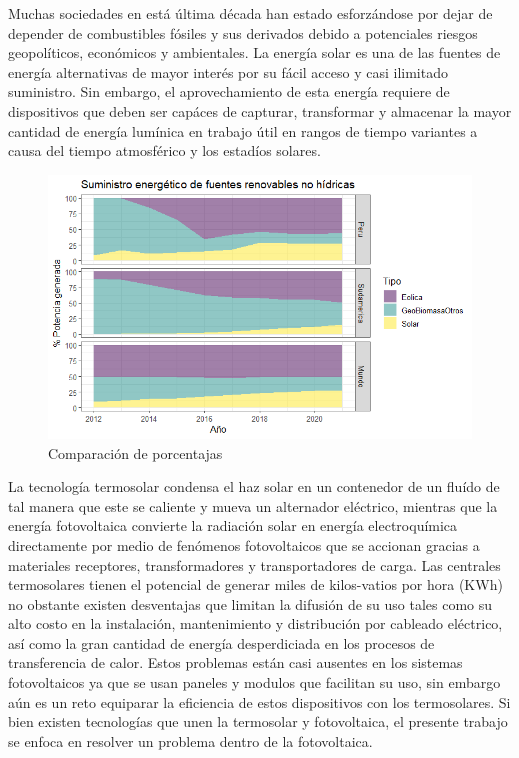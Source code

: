 Muchas sociedades en está última década han estado esforzándose por dejar de depender de combustibles
fósiles y sus derivados debido a potenciales riesgos geopolíticos, económicos y ambientales. La energía solar
es una de las fuentes de energía alternativas de mayor interés por su fácil acceso y casi ilimitado suministro.
Sin embargo, el aprovechamiento de esta energía requiere de dispositivos que deben ser capáces de capturar, transformar 
y almacenar la mayor cantidad de energía lumínica en trabajo útil en rangos de tiempo variantes a causa del tiempo atmosférico y
los estadíos solares.

\begin{figure}[h]
    \includegraphics[scale=0.8]{img/PorcentajeRenovables.png}
    \caption{Comparación de porcentajas}
    \label{img:PorcentajeRenovable}
\end{figure}

La tecnología termosolar condensa el haz solar en un contenedor de un fluído de tal manera que este se caliente
y mueva un alternador eléctrico, mientras que la energía fotovoltaica convierte la radiación solar en energía electroquímica directamente 
por medio de fenómenos fotovoltaicos que se accionan gracias a materiales receptores, transformadores y transportadores de carga.
Las centrales termosolares tienen el potencial de generar miles de kilos-vatios por hora (KWh) no obstante 
existen desventajas que limitan la difusión de su uso tales como su alto costo en la instalación, mantenimiento y distribución por cableado 
eléctrico, así como la gran cantidad de energía desperdiciada en los procesos de transferencia de calor. Estos problemas están casi ausentes
en los sistemas fotovoltaicos ya que se usan paneles y modulos que facilitan su uso, sin embargo aún es un reto equiparar la eficiencia de estos 
dispositivos con los termosolares. Si bien existen tecnologías que unen la termosolar y fotovoltaica, el presente trabajo se enfoca en resolver
un problema dentro de la fotovoltaica.

